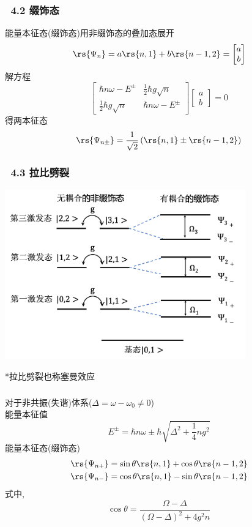 \begin{frame} 
    \frametitle{~4.2 缀饰态}
    能量本征态(缀饰态)用非缀饰态的叠加态展开 
    \[ \rs{\Psi_n} = a \rs{n, 1} + b\rs{n-1, 2} = \begin{bmatrix}
        a\\
        b 
     \end{bmatrix}\]
     解方程 
     \[ \begin{bmatrix}
        \hbar n \omega - E^{\pm}  & \frac{1}{2} \hbar g \sqrt{n} \\
        \frac{1}{2} \hbar g \sqrt{n} & \hbar n \omega -E^{\pm} 

     \end{bmatrix}        
     \begin{bmatrix}
            a \\
            b
         \end{bmatrix}
         =0\] 
得两本征态 
 \[\rs{\Psi_{n\pm}} = \frac{1}{\sqrt{2}} \left(\rs{n, 1} \pm \rs{n-1, 2}\right)\]
\end{frame}

\begin{frame} 
    \frametitle{~4.3 拉比劈裂}
   \begin{center}
        \includegraphics[width=0.78\textwidth]{figs/27.png}
   \end{center}
   *拉比劈裂也称塞曼效应
\end{frame}

\begin{frame} 
    \frametitle{}
        对于非共振(失谐)体系($\Delta = \omega -\omega_0 \not =0 $)\\ 
     能量本征值
        \[ E^{\pm} = \hbar n \omega \pm  \hbar \sqrt{ \Delta ^2 + \frac{1}{4} n g ^2 } \]
    能量本征态(缀饰态)
    \[\begin{aligned}
        \rs{\Psi_{n+}} & =  \sin \theta \rs{n, 1} + \cos \theta  \rs{n-1, 2} \\ 
        \rs{\Psi_{n-}} & =  \cos  \theta \rs{n, 1} - \sin \theta  \rs{n-1, 2} \\ 
    \end{aligned} \]
    式中, \[ \cos \theta = \frac{ \Omega - \Delta}{(\Omega - \Delta)^2 + 4g^2 n } \]
    \end{frame}

